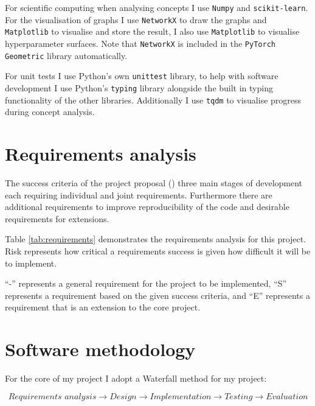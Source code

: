 For scientific computing when analysing concepts I use \texttt{Numpy} and \texttt{scikit-learn}. For the visualisation of graphs I use \texttt{NetworkX} to draw the graphs and \texttt{Matplotlib} to visualise and store the result, I also use \texttt{Matplotlib} to visualise hyperparameter surfaces. Note that \texttt{NetworkX} is included in the \texttt{PyTorch Geometric} library automatically.

For unit tests I use Python's own \texttt{unittest} library, to help with software development I use Python's \texttt{typing} library alongside the built in typing functionality of the other libraries. Additionally I use \texttt{tqdm} to visualise progress during concept analysis.

\section{Requirements analysis}


The success criteria of the project proposal () three main stages of development each requiring individual and joint requirements.
Furthermore there are additional requirements to improve reproducibility of the code and desirable requirements for extensions.

Table \ref{tab:requirements} demonstrates the requirements analysis for this project.
Risk represents how critical a requirements success is given how difficult it will be to implement.

``-'' represents a general requirement for the project to be implemented, ``S'' represents a requirement based on the given success criteria, and ``E'' represents a requirement that is an extension to the core project.



\section{Software methodology}


For the core of my project I adopt a Waterfall method \cite{royce1970managing} for my project:

\begin{equation*}
    \textit{Requirements analysis} \longrightarrow \textit{Design} \longrightarrow \textit{Implementation} \longrightarrow \textit{Testing} \longrightarrow \textit{Evaluation}
\end{equation*}

